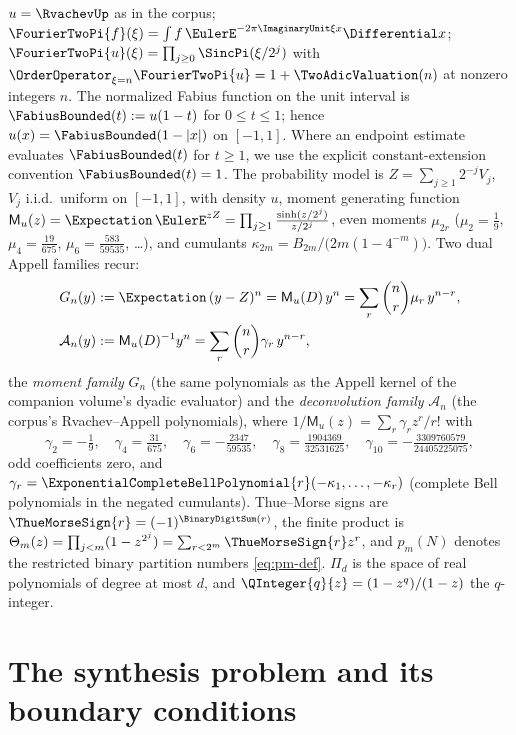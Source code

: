 \documentclass[11pt,oneside]{article}
\numberwithin{equation}{section}
\theoremstyle{definition}
\theoremstyle{remark}
\newcommand{\ThetaTM}{\Theta}
\newcommand{\MM}{\mathsf M}
\newcommand{\Gd}{\mathcal A}
\newcommand{\PiD}{\Pi_d}
\begin{document}
$u=\RvachevUp$ as in the corpus; $\FourierTwoPi{f}(\xi)=\int f\,\EulerE^{-2\pi\ImaginaryUnit\xi x}\Differential x$;
$\FourierTwoPi{u}(\xi)=\prod_{j\ge0}\SincPi(\xi/2^{j})$ with
$\OrderOperator_{\xi=n}\FourierTwoPi{u}=1+\TwoAdicValuation(n)$ at nonzero integers $n$.  The
normalized Fabius function on the unit interval is
$\FabiusBounded(t):=u(1-t)$ for $0\le t\le1$; hence
$u(x)=\FabiusBounded(1-|x|)$ on $[-1,1]$.  Where an endpoint estimate evaluates
$\FabiusBounded(t)$ for $t\ge1$, we use the explicit constant-extension convention
$\FabiusBounded(t)=1$.  The
probability model is $Z=\sum_{j\ge1}2^{-j}V_j$, $V_j$ i.i.d.\ uniform
on $[-1,1]$, with density $u$, moment generating function
$\MM_u(z)=\Expectation\,\EulerE^{zZ}=\prod_{j\ge1}\frac{\sinh(z/2^{j})}{z/2^{j}}$,
even moments $\mu_{2r}$ ($\mu_2=\tfrac19$, $\mu_4=\tfrac{19}{675}$,
$\mu_6=\tfrac{583}{59535}$, \dots), and cumulants
$\kappa_{2m}=B_{2m}/\bigl(2m(1-4^{-m})\bigr)$.  Two dual Appell
families recur:
\begin{equation}
 \begin{aligned}
 G_n(y)&:=\Expectation\,(y-Z)^{n}=\MM_u(D)\,y^{n}
 =\sum_{r}\binom nr\mu_r\,y^{n-r},\\
 \Gd_n(y)&:=\MM_u(D)^{-1}y^{n}
 =\sum_{r}\binom nr\gamma_r\,y^{n-r},
 \end{aligned}
 \label{eq:appell-pair}
\end{equation}
the \emph{moment family} $G_n$ (the same polynomials as the Appell
kernel of the companion volume's dyadic evaluator) and the
\emph{deconvolution family} $\Gd_n$ (the corpus's Rvachev--Appell
polynomials), where
$1/\MM_u(z)=\sum_r\gamma_rz^{r}/r!$ with
\begin{equation}
 \gamma_2=-\tfrac19,\quad
 \gamma_4=\tfrac{31}{675},\quad
 \gamma_6=-\tfrac{2347}{59535},\quad
 \gamma_8=\tfrac{1904369}{32531625},\quad
 \gamma_{10}=-\tfrac{3309760579}{24405225075},
 \label{eq:gamma-values}
\end{equation}
odd coefficients zero, and
$\gamma_r=\ExponentialCompleteBellPolynomial{r}(-\kappa_1,\dots,-\kappa_r)$ (complete Bell
polynomials in the negated cumulants).  Thue--Morse signs are
$\ThueMorseSign{r}=(-1)^{\BinaryDigitSum(r)}$, the finite product is
$\ThetaTM_m(z)=\prod_{j<m}(1-z^{2^{j}})=\sum_{r<2^{m}}\ThueMorseSign{r}z^{r}$,
and $p_m(N)$ denotes the restricted binary partition numbers
\eqref{eq:pm-def}.  $\PiD$ is the space of real polynomials of degree
at most $d$, and $\QInteger{q}{z}=(1-z^{q})/(1-z)$ the $q$-integer.

\section{The synthesis problem and its boundary conditions}
\label{sec:problem}
\end{document}
